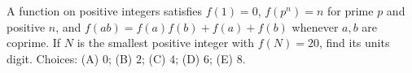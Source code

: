 A function on positive integers satisfies $f(1)=0$, $f(p^n)=n$ for prime $p$ and positive $n$, and $f(ab)=f(a)f(b)+f(a)+f(b)$ whenever $a,b$ are coprime. If $N$ is the smallest positive integer with $f(N)=20$, find its units digit. Choices: (A) $0$; (B) $2$; (C) $4$; (D) $6$; (E) $8$.
